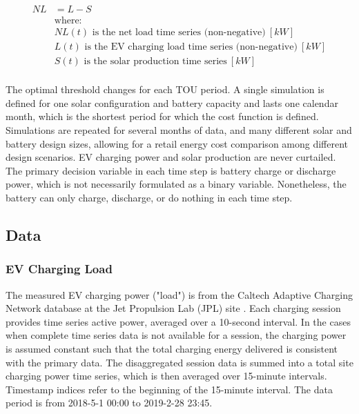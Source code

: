 \documentclass[journal,article,submit,pdftex,moreauthors]{Definitions/mdpi}
\begin{document}
\begin{equation}
  \label{eq:net-load}
  \begin{split}
    NL & = L - S                                                           \\
       & \text{where:}                                                     \\
       & NL(t) \text{ is the net load time series (non-negative)}\ [kW] \\
       & L(t) \text{ is the EV charging load time series (non-negative)}\ [kW] \\
       & S(t) \text{ is the solar production time series}\ [kW]                \\
  \end{split}
\end{equation}

The optimal threshold changes for each TOU period. A single simulation is defined for one solar configuration and battery capacity and lasts one calendar month, which is the shortest period for which the cost function is defined. Simulations are repeated for several months of data, and many different solar and battery design sizes, allowing for a retail energy cost comparison among different design scenarios. EV charging power and solar production are never curtailed. The primary decision variable in each time step is battery charge or discharge power, which is not necessarily formulated as a binary variable. Nonetheless, the battery can only charge, discharge, or do nothing in each time step.

\subsection{Data}\label{data}%

\subsubsection{{EV Charging Load }}\label{ev-charging-load}%

The measured EV charging power ("load") is from the Caltech Adaptive Charging Network database at the Jet Propulsion Lab (JPL) site \cite{Lee2021}. Each charging session provides time series active power, averaged over a 10-second interval. In the cases when complete time series data is not available for a session, the charging power is assumed constant such that the total charging energy delivered is consistent with the primary data. The disaggregated session data is summed into a total site charging power time series, which is then averaged over 15-minute intervals. Timestamp indices refer to the beginning of the 15-minute interval. The data period is from 2018-5-1 00:00 to 2019-2-28 23:45.
\end{document}
